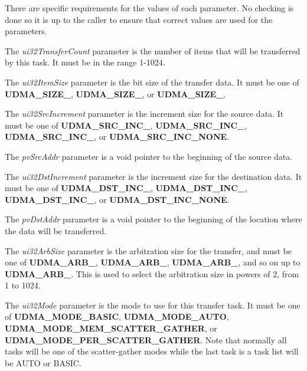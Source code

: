 There are specific requirements for the values of each parameter. No checking is done so it is up to the caller to ensure that correct values are used for the parameters.

The {\itshape ui32\+Transfer\+Count} parameter is the number of items that will be transferred by this task. It must be in the range 1-\/1024.

The {\itshape ui32\+Item\+Size} parameter is the bit size of the transfer data. It must be one of {\bfseries U\+D\+M\+A\+\_\+\+S\+I\+Z\+E\+\_}, {\bfseries U\+D\+M\+A\+\_\+\+S\+I\+Z\+E\+\_}, or {\bfseries U\+D\+M\+A\+\_\+\+S\+I\+Z\+E\+\_}.

The {\itshape ui32\+Src\+Increment} parameter is the increment size for the source data. It must be one of {\bfseries U\+D\+M\+A\+\_\+\+S\+R\+C\+\_\+\+I\+N\+C\+\_}, {\bfseries U\+D\+M\+A\+\_\+\+S\+R\+C\+\_\+\+I\+N\+C\+\_}, {\bfseries U\+D\+M\+A\+\_\+\+S\+R\+C\+\_\+\+I\+N\+C\+\_}, or {\bfseries U\+D\+M\+A\+\_\+\+S\+R\+C\+\_\+\+I\+N\+C\+\_\+\+N\+O\+NE}.

The {\itshape pv\+Src\+Addr} parameter is a void pointer to the beginning of the source data.

The {\itshape ui32\+Dst\+Increment} parameter is the increment size for the destination data. It must be one of {\bfseries U\+D\+M\+A\+\_\+\+D\+S\+T\+\_\+\+I\+N\+C\+\_}, {\bfseries U\+D\+M\+A\+\_\+\+D\+S\+T\+\_\+\+I\+N\+C\+\_}, {\bfseries U\+D\+M\+A\+\_\+\+D\+S\+T\+\_\+\+I\+N\+C\+\_}, or {\bfseries U\+D\+M\+A\+\_\+\+D\+S\+T\+\_\+\+I\+N\+C\+\_\+\+N\+O\+NE}.

The {\itshape pv\+Dst\+Addr} parameter is a void pointer to the beginning of the location where the data will be transferred.

The {\itshape ui32\+Arb\+Size} parameter is the arbitration size for the transfer, and must be one of {\bfseries U\+D\+M\+A\+\_\+\+A\+R\+B\+\_}, {\bfseries U\+D\+M\+A\+\_\+\+A\+R\+B\+\_}, {\bfseries U\+D\+M\+A\+\_\+\+A\+R\+B\+\_}, and so on up to {\bfseries U\+D\+M\+A\+\_\+\+A\+R\+B\+\_}. This is used to select the arbitration size in powers of 2, from 1 to 1024.

The {\itshape ui32\+Mode} parameter is the mode to use for this transfer task. It must be one of {\bfseries U\+D\+M\+A\+\_\+\+M\+O\+D\+E\+\_\+\+B\+A\+S\+IC}, {\bfseries U\+D\+M\+A\+\_\+\+M\+O\+D\+E\+\_\+\+A\+U\+TO}, {\bfseries U\+D\+M\+A\+\_\+\+M\+O\+D\+E\+\_\+\+M\+E\+M\+\_\+\+S\+C\+A\+T\+T\+E\+R\+\_\+\+G\+A\+T\+H\+ER}, or {\bfseries U\+D\+M\+A\+\_\+\+M\+O\+D\+E\+\_\+\+P\+E\+R\+\_\+\+S\+C\+A\+T\+T\+E\+R\+\_\+\+G\+A\+T\+H\+ER}. Note that normally all tasks will be one of the scatter-\/gather modes while the last task is a task list will be A\+U\+TO or B\+A\+S\+IC.

